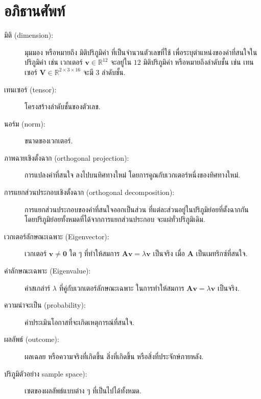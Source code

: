 \section{อภิธานศัพท์}

\begin{description}
	\item[มิติ (dimension):]
	มุมมอง
	หรือหมายถึง	มิติปริภูมิค่า ที่เป็นจำนวนตัวเลขที่ใช้ เพื่อระบุตำแหน่งของค่าที่สนใจในปริภูมิค่า เช่น เวกเตอร์ $\bm{v} \in \mathbb{R}^{12}$ จะอยู่ใน $12$ มิติปริภูมิค่า
	หรือหมายถึงลำดับชั้น เช่น เทนเซอร์ $\bm{V} \in \mathbb{R}^{2 \times 3 \times 16}$ จะมี $3$ ลำดับชั้น.
	
	\item[เทนเซอร์ (tensor):]
	โครงสร้างลำดับชั้นของตัวเลข.

	\item[นอร์ม (norm):]
	ขนาดของเวกเตอร์.
	
	\item[ภาพฉายเชิงตั้งฉาก (orthogonal projection):]
	การแปลงค่าที่สนใจ ลงไปบนทิศทางใหม่ โดยการคูณกับเวกเตอร์หนึ่งของทิศทางใหม่.
	
	\item[การแยกส่วนประกอบเชิงตั้งฉาก (orthogonal decomposition):]
	การแยกส่วนประกอบของค่าที่สนใจออกเป็นส่วน
	ที่แต่ละส่วนอยู่ในปริภูมิย่อยที่ตั้งฉากกัน
	โดยปริภูมิย่อยทั้งหมดที่ได้จากการแยกส่วนประกอบ จะแผ่ทั่วปริภูมิเดิม.
	
	\item[เวกเตอร์ลักษณะเฉพาะ (Eigenvector):]
	เวกเตอร์ $\bm{v} \neq \bm{0}$ ใด ๆ ที่ทำให้สมการ $\bm{A} \bm{v} = \lambda \bm{v}$ เป็นจริง เมื่อ $\bm{A}$ เป็นเมทริกซ์ที่สนใจ.
	
	\item[ค่าลักษณะเฉพาะ (Eigenvalue):]
	ค่าสเกล่าร์ $\lambda$ ที่คู่กับเวกเตอร์ลักษณะเฉพาะ
	ในการทำให้สมการ $\bm{A} \bm{v} = \lambda \bm{v}$ เป็นจริง.

	\item[ความน่าจะเป็น (probability):]
ค่าประเมินโอกาสที่จะเกิดเหตุการณ์ที่สนใจ.

\item[ผลลัพธ์ (outcome):]
ผลเฉลย หรือความจริงที่เกิดขึ้น สิ่งที่เกิดขึ้น หรือสิ่งที่ประจักษ์ภายหลัง.

\item[ปริภูมิตัวอย่าง sample space):]	
เซตของผลลัพธ์แบบต่าง ๆ ที่เป็นไปได้ทั้งหมด.


\end{description}
